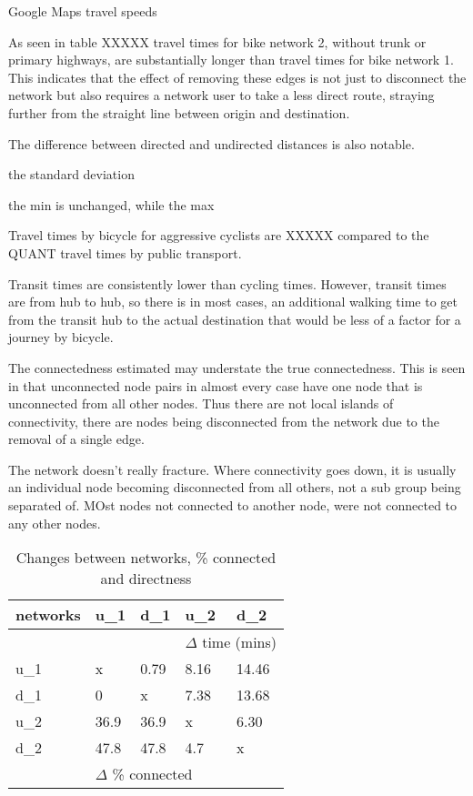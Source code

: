 \begin{table}
\centering
\caption{Google Maps travel speeds}
\label{table:travel_speeds}
\end{table}

As seen in table XXXXX travel times for bike network 2, without trunk or primary highways, are substantially longer than travel times for bike network 1. This indicates that the effect of removing these edges is not just to disconnect the network but also requires a network user to take a less direct route, straying further from the straight line between origin and destination. 

The difference between directed and undirected distances is also notable. 

the standard deviation 

the min is unchanged, while the max 

Travel times by bicycle for aggressive cyclists are XXXXX compared to the QUANT travel times by public transport. 

Transit times are consistently lower than cycling times. However, transit times are from hub to hub, so there is in most cases, an additional walking time to get from the transit hub to the actual destination that would be less of a factor for a journey by bicycle. 

The connectedness estimated may understate the true connectedness. This is seen in that unconnected node pairs in almost every case have one node that is unconnected from all other nodes. Thus there are not local islands of connectivity, there are nodes being disconnected from the network due to the removal of a single edge. 

The network doesn't really fracture. Where connectivity goes down, it is usually an individual node becoming disconnected from all others, not a sub group being separated of. MOst nodes not connected to another node, were not connected to any other nodes. 


\begin{table}
\centering
\begin{tabular}{@{}lllll@{}}
\toprule
networks & u\_1   & d\_1  & u\_2            & d\_2          \\ \midrule
         &        &       & \multicolumn{2}{l}{$\Delta$ time (mins)}  \\
u\_1     & x      &  0.79 & 8.16            & 14.46         \\
d\_1     & 0      & x     & 7.38            & 13.68         \\
u\_2     & 36.9   & 36.9  & x               & 6.30          \\
d\_2     & 47.8   & 47.8  & 4.7             & x             \\
         & \multicolumn{3}{l}{$\Delta$ \% connected} &               \\ \bottomrule
\end{tabular}
\caption{Changes between networks, \% connected and directness}
\label{table:change between nets}
\end{table}

